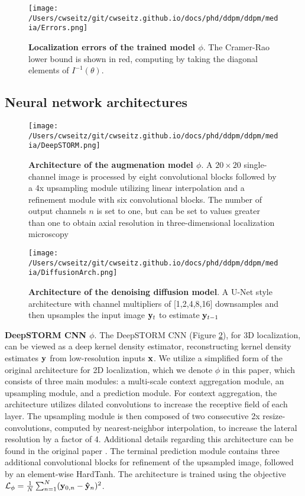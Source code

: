 \begin{figure}[t]
\centering
\texttt{[image: /Users/cwseitz/git/cwseitz.github.io/docs/phd/ddpm/ddpm/media/Errors.png]}
\caption{\textbf{Localization errors of the trained model $\phi$}. The Cramer-Rao lower bound is shown in red, computing by taking the diagonal elements of $I^{-1}(\theta)$.}
\label{fig:fig15}
\end{figure}


\subsection{Neural network architectures}

\begin{figure}[t]
\centering
\texttt{[image: /Users/cwseitz/git/cwseitz.github.io/docs/phd/ddpm/ddpm/media/DeepSTORM.png]}
\caption{\textbf{Architecture of the augmenation model $\phi$}. A $20\times 20$ single-channel image is processed by eight convolutional blocks followed by a 4x upsampling module utilizing linear interpolation and a refinement module with six convolutional blocks. The number of output channels $n$ is set to one, but can be set to values greater than one to obtain axial resolution in three-dimensional localization microscopy}
\label{fig:fig13}
\end{figure}


\begin{figure}[t]
\centering
\texttt{[image: /Users/cwseitz/git/cwseitz.github.io/docs/phd/ddpm/ddpm/media/DiffusionArch.png]}
\caption{\textbf{Architecture of the denoising diffusion model}. A U-Net style architecture with channel multipliers of [1,2,4,8,16] downsamples and then upsamples the input image $\bold{y}_{t}$ to estimate $\bold{y}_{t-1}$}
\label{fig:fig14}
\end{figure}

\textbf{DeepSTORM CNN $\phi$}. The DeepSTORM CNN (Figure \ref{fig:fig13}), for 3D localization, can be viewed as a deep kernel density estimator, reconstructing kernel density estimates $\bold{y}$ from low-resolution inputs $\bold{x}$. We utilize a simplified form of the original architecture \parencite{Nehme2020} for 2D localization, which we denote $\phi$ in this paper, which consists of three main modules: a multi-scale context aggregation module, an upsampling module, and a prediction module. For context aggregation, the architecture utilizes dilated convolutions to increase the receptive field of each layer. The upsampling module is then composed of two consecutive 2x resize-convolutions, computed by nearest-neighbor interpolation, to increase the lateral resolution by a factor of 4. Additional details regarding this architecture can be found in the original paper \cite{Nehme2020}. The terminal prediction module contains three additional convolutional blocks for refinement of the upsampled image, followed by an element-wise HardTanh. The architecture is trained using the objective $\mathcal{L}_{\phi} = \frac{1}{N}\sum_{n=1}^{N} (\bold{y}_{0,n}-\bold{\hat{y}}_{n})^{2}$. 

